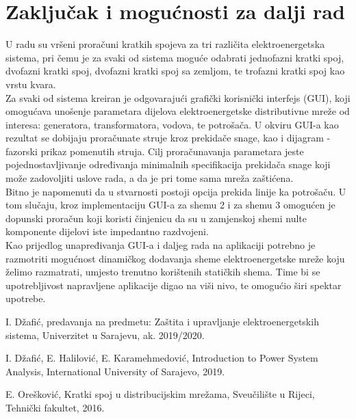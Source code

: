 \documentclass[a4paper, 12pt]{article}
\numberwithin{figure}{section}
\numberwithin{equation}{section}
\begin{document}
\newpage
\section{Zaključak i mogućnosti za dalji rad}

U radu su vršeni proračuni kratkih spojeva za tri različita elektroenergetska sistema, pri čemu je za svaki od sistema moguće odabrati jednofazni kratki spoj, dvofazni kratki spoj, dvofazni kratki spoj sa zemljom, te trofazni kratki spoj kao vrstu kvara. \\

Za svaki od sistema kreiran je odgovarajući grafički korisnički interfejs (GUI), koji omogućava unošenje parametara dijelova elektroenergetske distributivne mreže od interesa: generatora, transformatora, vodova, te potrošača. U okviru GUI-a kao rezultat se dobijaju proračunate struje kroz prekidače snage, kao i dijagram - fazorski prikaz pomenutih struja. Cilj proračunavanja parametara jeste pojednostavljivanje određivanja minimalnih specifikacija prekidača snage koji može zadovoljiti uslove rada, a da je pri tome sama mreža zaštićena. \\

Bitno je napomenuti da u stvarnosti postoji opcija prekida linije ka potrošaču. U tom slučaju, kroz implementaciju GUI-a za shemu 2 i za shemu 3 omogućen je dopunski proračun koji koristi činjenicu da su u zamjenskoj shemi nulte komponente dijelovi iste impedantno razdvojeni. \\

Kao prijedlog unapređivanja GUI-a i daljeg rada na aplikaciji potrebno je razmotriti mogućnost dinamičkog dodavanja sheme elektroenergetske mreže koju želimo razmatrati, umjesto trenutno korištenih statičkih shema. Time bi se upotrebljivost napravljene aplikacije digao na viši nivo, te omogućio širi spektar upotrebe.



\newpage
\begin{thebibliography}{00}

 I. Džafić, predavanja na predmetu: Zaštita i upravljanje elektroenergetskih sistema, Univerzitet u Sarajevu, ak. 2019/2020.

 I. Džafić, E. Halilović, E. Karamehmedović, Introduction to
Power System Analysis, International University of Sarajevo, 2019.

 E. Orešković, Kratki spoj u distribucijskim mrežama, Sveučilište u Rijeci, Tehnički fakultet, 2016.


\end{thebibliography}
\end{document}
